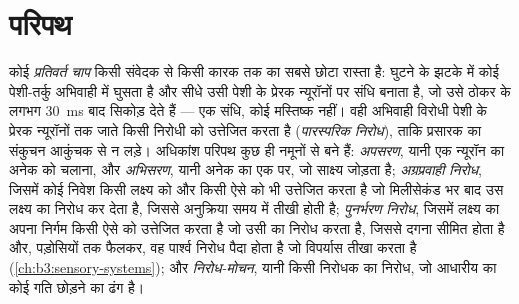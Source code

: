 \section{परिपथ}

\begin{definition}[प्राथमिक परिपथ]\label{def:b3:nervous-systems:circuits}
कोई \emph{प्रतिवर्त चाप} किसी संवेदक से किसी कारक तक का सबसे छोटा
रास्ता है: घुटने के झटके में कोई पेशी-तर्कु अभिवाही  में
घुसता है और सीधे उसी पेशी के प्रेरक न्यूरॉनों पर संधि बनाता है, जो उसे
ठोकर के लगभग \qty{30}{ms} बाद सिकोड़ देते हैं --- एक संधि, कोई
मस्तिष्क नहीं। वही अभिवाही विरोधी पेशी के प्रेरक न्यूरॉनों तक जाते किसी
निरोधी  को उत्तेजित करता है (\emph{पारस्परिक निरोध}), ताकि
प्रसारक का संकुचन आकुंचक से न लड़े। अधिकांश परिपथ कुछ ही नमूनों से बने
हैं: \emph{अपसरण}, यानी एक न्यूरॉन का अनेक को चलाना, और
\emph{अभिसरण}, यानी अनेक का एक पर, जो साक्ष्य जोड़ता है;
\emph{अग्रप्रवाही निरोध}, जिसमें कोई निवेश किसी लक्ष्य को और किसी ऐसे
 को भी उत्तेजित करता है जो मिलीसेकंड भर बाद उस लक्ष्य का
निरोध कर देता है, जिससे अनुक्रिया समय में तीखी होती है; \emph{पुनर्भरण
निरोध}, जिसमें लक्ष्य का अपना निर्गम किसी ऐसे  को उत्तेजित
करता है जो उसी का निरोध करता है, जिससे दगना सीमित होता है और, पड़ोसियों
तक फैलकर, वह पार्श्व निरोध पैदा होता है जो विपर्यास तीखा करता है
(\cref{ch:b3:sensory-systems}); और \emph{निरोध-मोचन}, यानी किसी निरोधक
का निरोध, जो आधारीय  का कोई गति छोड़ने का ढंग है।
\end{definition}

